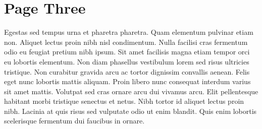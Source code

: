 \section{Page Three}

Egestas sed tempus urna et pharetra pharetra. Quam elementum pulvinar etiam non. Aliquet lectus proin nibh nisl condimentum. Nulla facilisi cras fermentum odio eu feugiat pretium nibh ipsum. Sit amet facilisis magna etiam tempor orci eu lobortis elementum. Non diam phasellus vestibulum lorem sed risus ultricies tristique. Non curabitur gravida arcu ac tortor dignissim convallis aenean. Felis eget nunc lobortis mattis aliquam. Proin libero nunc consequat interdum varius sit amet mattis. Volutpat sed cras ornare arcu dui vivamus arcu. Elit pellentesque habitant morbi tristique senectus et netus. Nibh tortor id aliquet lectus proin nibh. Lacinia at quis risus sed vulputate odio ut enim blandit. Quis enim lobortis scelerisque fermentum dui faucibus in ornare.